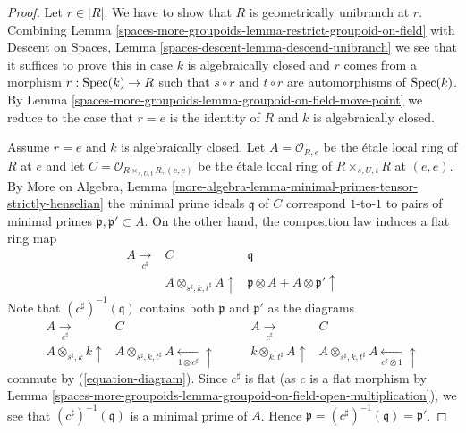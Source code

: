 \begin{proof}
Let $r \in |R|$. We have to show that $R$ is geometrically unibranch
at $r$. Combining
Lemma \ref{spaces-more-groupoids-lemma-restrict-groupoid-on-field}
with
Descent on Spaces, Lemma \ref{spaces-descent-lemma-descend-unibranch}
we see that it suffices to prove this in case $k$ is algebraically closed
and $r$ comes from a morphism $r : \operatorname{Spec}(k) \to R$ such that
$s \circ r$ and $t \circ r$
are automorphisms of $\operatorname{Spec}(k)$. By
Lemma \ref{spaces-more-groupoids-lemma-groupoid-on-field-move-point}
we reduce to the case that $r = e$ is the identity of $R$ and $k$ is
algebraically closed.

\medskip\noindent
Assume $r = e$ and $k$ is algebraically closed. Let
$A = \mathcal{O}_{R, e}$ be the \'etale local ring of
$R$ at $e$ and let
$C = \mathcal{O}_{R \times_{s, U, t} R, (e, e)}$
be the \'etale local ring of $R \times_{s, U, t} R$ at $(e, e)$.
By More on Algebra, Lemma
\ref{more-algebra-lemma-minimal-primes-tensor-strictly-henselian}
the minimal prime ideals $\mathfrak q$ of $C$ correspond $1$-to-$1$
to pairs of minimal primes $\mathfrak p, \mathfrak p' \subset A$.
On the other hand, the composition law induces a flat ring map
$$
\begin{array}{ccc}A \underset{c^\sharp}{\longrightarrow} & C & \mathfrak q \\  & A \otimes_{s^\sharp, k, t^\sharp} A \uparrow & \mathfrak p \otimes A + A \otimes \mathfrak p' \uparrow\end{array}
$$
Note that $(c^\sharp)^{-1}(\mathfrak q)$ contains both $\mathfrak p$ and
$\mathfrak p'$ as the diagrams
$$
\begin{array}{cc}A \underset{c^\sharp}{\longrightarrow} & C \\ A \otimes_{s^\sharp, k} k \uparrow & A \otimes_{s^\sharp, k, t^\sharp} A \underset{1 \otimes e^\sharp}{\longleftarrow}\uparrow\end{array}
\quad\quad
\begin{array}{cc}A \underset{c^\sharp}{\longrightarrow} & C \\ k \otimes_{k, t^\sharp} A \uparrow & A \otimes_{s^\sharp, k, t^\sharp} A \underset{e^\sharp \otimes 1}{\longleftarrow}\uparrow\end{array}
$$
commute by (\ref{equation-diagram}).
Since $c^\sharp$ is flat (as $c$ is a flat morphism by
Lemma \ref{spaces-more-groupoids-lemma-groupoid-on-field-open-multiplication}),
we see that $(c^\sharp)^{-1}(\mathfrak q)$ is a minimal prime
of $A$. Hence $\mathfrak p = (c^\sharp)^{-1}(\mathfrak q) = \mathfrak p'$.
\end{proof}

